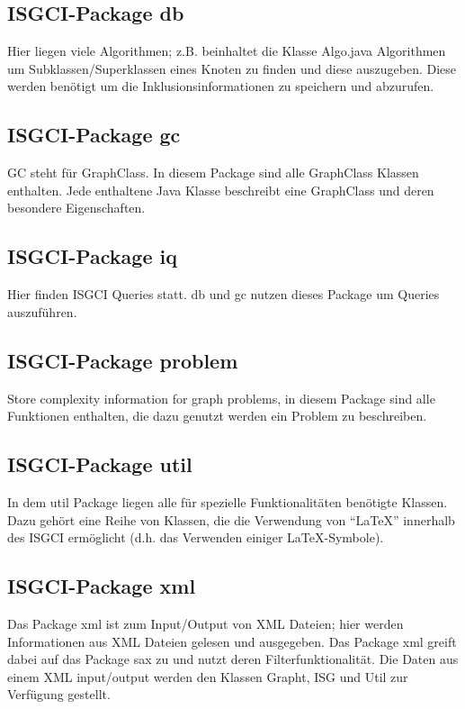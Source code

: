 \documentclass[10pt,a4paper]{article}
\begin{document}
\subsection{ISGCI-Package db}
Hier liegen viele Algorithmen; z.B. beinhaltet die Klasse Algo.java Algorithmen um Subklassen/Superklassen eines Knoten zu finden und diese auszugeben. Diese werden benötigt um die Inklusionsinformationen zu speichern und abzurufen.\\

\subsection{ISGCI-Package gc}
GC steht für GraphClass. In diesem Package sind alle GraphClass Klassen enthalten. Jede enthaltene Java Klasse beschreibt eine GraphClass und deren besondere Eigenschaften.\\

\subsection{ISGCI-Package iq}
Hier finden ISGCI Queries statt. db und gc nutzen dieses Package um Queries auszuführen. \\

\subsection{ISGCI-Package problem}
Store complexity information for graph problems, in diesem Package sind alle Funktionen enthalten, die dazu genutzt werden ein Problem zu beschreiben.\\

\subsection{ISGCI-Package util}
In dem util Package liegen alle für spezielle Funktionalitäten benötigte Klassen. Dazu gehört eine Reihe von Klassen, die die Verwendung von "`LaTeX"' innerhalb des ISGCI ermöglicht (d.h. das Verwenden einiger LaTeX-Symbole).\\


\subsection{ISGCI-Package xml}
Das Package xml ist zum Input/Output von XML Dateien; hier werden Informationen aus XML Dateien gelesen und ausgegeben. Das Package xml greift dabei auf das Package sax zu und nutzt deren Filterfunktionalität. Die Daten aus einem XML input/output werden den Klassen Grapht, ISG und Util zur Verfügung gestellt. \\
\end{document}
